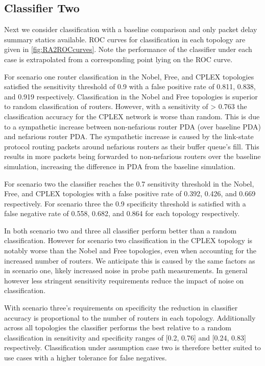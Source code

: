 \subsection{Classifier Two}
\label{ssec:Ras2}
Next we consider classification with a baseline comparison and only packet delay summary statics available. ROC curves for classification in each topology are given in \cref{fig:RA2ROCcurves}. Note the performance of the classifier under each case is extrapolated from a corresponding point lying on the ROC curve.\par
For scenario one router classification in the Nobel, Free, and CPLEX topologies satisfied the sensitivity threshold of 0.9 with a false positive rate of 0.811, 0.838, and 0.919 respectively. Classification in the Nobel and Free topologies is superior to random classification of routers. However, with a sensitivity of > 0.763 the classification accuracy for the CPLEX network is worse than random. This is due to a sympathetic increase between non-nefarious router PDA (over baseline PDA) and nefarious router PDA. The sympathetic increase is caused by the link-state protocol routing packets around nefarious routers as their buffer queue's fill. This results in more packets being forwarded to non-nefarious routers over the baseline simulation, increasing the difference in PDA from the baseline simulation.\par
For scenario two the classifier reaches the 0.7 sensitivity threshold in the Nobel, Free, and CPLEX topologies with a false positive rate of 0.392, 0.426, and 0.669 respectively. For scenario three the 0.9 specificity threshold is satisfied with a false negative rate of 0.558, 0.682, and 0.864 for each topology respectively.\par
In both scenario two and three all classifier perform better than a random classification. However for scenario two classification in the CPLEX topology is notably worse than the Nobel and Free topologies, even when accounting for the increased number of routers. We anticipate this is caused by the same factors as in scenario one, likely increased noise in probe path measurements. In general however less stringent sensitivity requirements reduce the impact of noise on classification.\par
With scenario three's requirements on specificity the reduction in classifier accuracy is proportional to the number of routers in each topology. Additionally across all topologies the classifier performs the best relative to a random classification in sensitivity and specificity ranges of [0.2, 0.76] and [0.24, 0.83] respectively. Classification under assumption case two is therefore better suited to use cases with a higher tolerance for false negatives.\par

